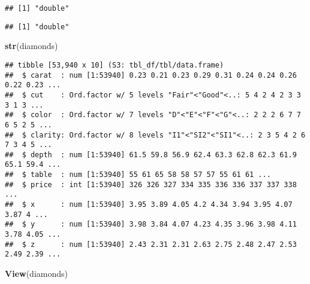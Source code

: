 \documentclass[
]{article}
\newenvironment{Shaded}{\begin{snugshade}}{\end{snugshade}}
\newcommand{\KeywordTok}[1]{\textcolor[rgb]{0.13,0.29,0.53}{\textbf{#1}}}
\newcommand{\NormalTok}[1]{#1}
\newcommand{\OperatorTok}[1]{\textcolor[rgb]{0.81,0.36,0.00}{\textbf{#1}}}
\begin{document}
\begin{Shaded}
\end{Shaded}

\begin{verbatim}
## [1] "double"
\end{verbatim}

\begin{Shaded}
\end{Shaded}

\begin{verbatim}
## [1] "double"
\end{verbatim}

\begin{Shaded}
\begin{Highlighting}[]
\KeywordTok{str}\NormalTok{(diamonds)}
\end{Highlighting}
\end{Shaded}

\begin{verbatim}
## tibble [53,940 x 10] (S3: tbl_df/tbl/data.frame)
##  $ carat  : num [1:53940] 0.23 0.21 0.23 0.29 0.31 0.24 0.24 0.26 0.22 0.23 ...
##  $ cut    : Ord.factor w/ 5 levels "Fair"<"Good"<..: 5 4 2 4 2 3 3 3 1 3 ...
##  $ color  : Ord.factor w/ 7 levels "D"<"E"<"F"<"G"<..: 2 2 2 6 7 7 6 5 2 5 ...
##  $ clarity: Ord.factor w/ 8 levels "I1"<"SI2"<"SI1"<..: 2 3 5 4 2 6 7 3 4 5 ...
##  $ depth  : num [1:53940] 61.5 59.8 56.9 62.4 63.3 62.8 62.3 61.9 65.1 59.4 ...
##  $ table  : num [1:53940] 55 61 65 58 58 57 57 55 61 61 ...
##  $ price  : int [1:53940] 326 326 327 334 335 336 336 337 337 338 ...
##  $ x      : num [1:53940] 3.95 3.89 4.05 4.2 4.34 3.94 3.95 4.07 3.87 4 ...
##  $ y      : num [1:53940] 3.98 3.84 4.07 4.23 4.35 3.96 3.98 4.11 3.78 4.05 ...
##  $ z      : num [1:53940] 2.43 2.31 2.31 2.63 2.75 2.48 2.47 2.53 2.49 2.39 ...
\end{verbatim}

\begin{Shaded}
\begin{Highlighting}[]
\KeywordTok{View}\NormalTok{(diamonds)}
\end{Highlighting}
\end{Shaded}
\end{document}
